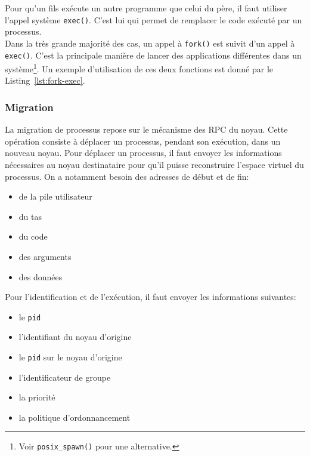         Pour qu'un fils exécute un autre programme que celui du père, il faut
        utiliser l'appel système \texttt{exec()}. C'est lui qui permet de
        remplacer le code exécuté par un processus.\\

        Dans la très grande majorité des cas, un appel à \texttt{fork()} est
        suivit d'un appel à \texttt{exec()}. C'est la principale manière de
        lancer des applications différentes dans un système\footnote{Voir
          \texttt{posix\_spawn()} pour une alternative.}. Un exemple
          d'utilisation de ces deux fonctions est donné par le
          Listing~\ref{lst:fork-exec}.

         \FloatBarrier

      \subsubsection{Migration}

        La migration de processus repose sur le mécanisme des RPC du
        noyau. Cette opération consiste à déplacer un processus, pendant son
        exécution, dans un nouveau noyau. Pour déplacer un processus, il faut
        envoyer les informations nécessaires au noyau destinataire pour qu'il
        puisse reconstruire l'espace virtuel du processus. On a notamment besoin
        des adresses de début et de fin:
        \begin{itemize}
          \item de la pile utilisateur
          \item du tas
          \item du code
          \item des arguments
          \item des données
        \end{itemize}
        Pour l'identification et de l'exécution, il faut envoyer les
        informations suivantes:
        \begin{itemize}
          \item le \texttt{pid}
          \item l'identifiant du noyau d'origine
          \item le \texttt{pid} sur le noyau d'origine
          \item l'identificateur de groupe
          \item la priorité
          \item la politique d'ordonnancement\\
        \end{itemize}

